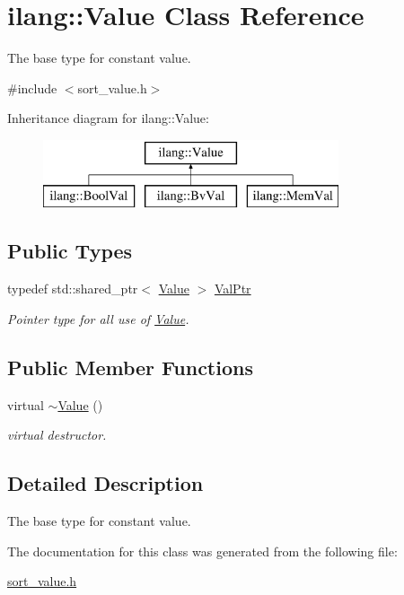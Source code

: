 \hypertarget{classilang_1_1_value}{}\section{ilang\+:\+:Value Class Reference}
\label{classilang_1_1_value}


The base type for constant value.  




{\ttfamily \#include $<$sort\+\_\+value.\+h$>$}

Inheritance diagram for ilang\+:\+:Value\+:\begin{figure}[H]
\begin{center}
\leavevmode
\includegraphics[height=2.000000cm]{classilang_1_1_value}
\end{center}
\end{figure}
\subsection*{Public Types}
\begin{DoxyCompactItemize}
\item 
\mbox{\label{classilang_1_1_value_af7f5423825f03fdb5f62d2598778d644}} 
typedef std\+::shared\+\_\+ptr$<$ \mbox{\hyperlink{classilang_1_1_value}{Value}} $>$ \mbox{\hyperlink{classilang_1_1_value_af7f5423825f03fdb5f62d2598778d644}{Val\+Ptr}}
\begin{DoxyCompactList}\small\item\em Pointer type for all use of \mbox{\hyperlink{classilang_1_1_value}{Value}}. \end{DoxyCompactList}\end{DoxyCompactItemize}
\subsection*{Public Member Functions}
\begin{DoxyCompactItemize}
\item 
\mbox{\label{classilang_1_1_value_a9aaafbcf15d374b218174a146288da79}} 
virtual \mbox{\hyperlink{classilang_1_1_value_a9aaafbcf15d374b218174a146288da79}{$\sim$\+Value}} ()
\begin{DoxyCompactList}\small\item\em virtual destructor. \end{DoxyCompactList}\end{DoxyCompactItemize}


\subsection{Detailed Description}
The base type for constant value. 

The documentation for this class was generated from the following file\+:\begin{DoxyCompactItemize}
\item 
\mbox{\hyperlink{sort__value_8h}{sort\+\_\+value.\+h}}\end{DoxyCompactItemize}
